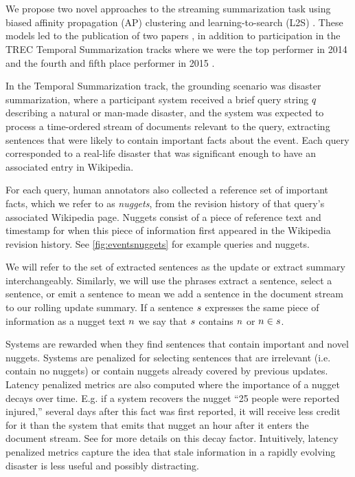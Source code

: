 ~\\
~\\







We propose two novel approaches to the streaming summarization task
using biased affinity propagation (AP) clustering \citep{frey2007clustering}
and learning-to-search (L2S) \citep{daume2009search,chang2015learning}.
These models led to the publication of two papers 
\citep{kedzie2015predicting,kedzie2016real}, in addition to participation 
in the TREC Temporal Summarization tracks where we were the top performer in
2014 and the fourth and fifth place performer in 2015 
\citep{aslam2015trec,aslam2016trec}. 

In the Temporal Summarization track, the grounding scenario was disaster
summarization, where a participant system received a brief query string 
$q$ describing a natural or man-made disaster, and the system was 
expected to process a time-ordered stream of documents relevant to the query, 
extracting sentences that were likely to contain important facts about the
event. Each query corresponded to a real-life disaster that was significant
enough to have an associated entry in Wikipedia.

For each query, human annotators also collected a reference set of important 
facts, which we refer to as \textit{nuggets}, 
from the revision history of that query's associated Wikipedia page. 
Nuggets consist of a piece of reference text and timestamp for when this piece
of information first appeared in the Wikipedia revision history. 
See \autoref{fig:eventsnuggets} for example queries and nuggets.



We will refer to the set of extracted sentences as the update or extract
summary interchangeably. Similarly, we will use the phrases extract a sentence,
select a sentence, or emit a sentence to mean we add a sentence in the 
document stream to our rolling update summary. If a sentence $s$ 
expresses the same piece of information as a nugget text $n$ 
we say that $s$ contains $n$ or $n \in s$.

Systems are rewarded when they find sentences that contain important and novel
nuggets. Systems are penalized for 
selecting sentences that are irrelevant (i.e. contain no nuggets) or 
contain nuggets already covered by previous updates. 
Latency penalized metrics are also computed where
the importance of a nugget decays over time. E.g. if a system
recovers the nugget ``25 people were reported injured,'' several days
after this fact was first reported, it will receive less credit for it
than the system that emits that nugget an hour after it enters the 
document stream. See \cite{aslam2014trec} for more details on this decay 
factor. Intuitively, latency penalized metrics capture the idea that stale
information in a rapidly evolving disaster is less useful and possibly
distracting.

